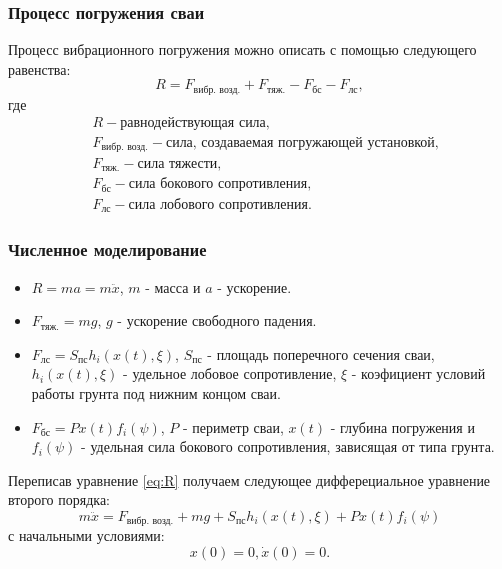 \documentclass{beamer}
\begin{document}
    \begin{frame}
        \frametitle{Процесс погружения сваи}
        Процесс вибрационного погружения можно описать с помощью следующего равенства:
        \begin{equation}
            \label{eq:R}
            R = F_\text{вибр. возд.} + F_\text{тяж.} - F_\text{бс} - F_\text{лс},
        \end{equation}
        где
        \begin{equation*}
            \begin{aligned}
                &R - \text{равнодействующая сила,}\\
                &F_\text{вибр. возд.} - \text{сила, создаваемая погружающей установкой,}\\
                &F_\text{тяж.} - \text{сила тяжести,}\\
                &F_\text{бс} - \text{сила бокового сопротивления,}\\
                &F_\text{лс} - \text{сила лобового сопротивления.}
            \end{aligned}
        \end{equation*}
    \end{frame}

    \begin{frame}
        \frametitle{Численное моделирование}
        \begin{itemize}
            \item $R = ma = m\ddot{x}$, { $m$ - масса и $a$ - ускорение.}
            \item $F_\text{тяж.} = mg$, { $g$ - ускорение свободного падения.}
            \item $F_\text{лс} = S_\text{пс} h_i(x(t), \xi)$, { $S_\text{пс}$ - площадь поперечного сечения
            сваи, $h_i(x(t), \xi)$ - удельное лобовое сопротивление, $\xi$ - коэфициент условий работы грунта под нижним
            концом сваи.}
            \item $F_\text{бс} = P x(t) f_i(\psi)$, { $P$ - периметр сваи, $x(t)$ - глубина погружения и $f_i(\psi)$ - удельная
            сила бокового сопротивления, зависящая от типа грунта.}
            \end{itemize}
        Переписав уравнение \ref{eq:R} получаем следующее дифферециальное уравнение второго порядка:
        \begin{equation}
            \label{eq:main}
            m\ddot{x} = F_\text{вибр. возд.} + mg + S_\text{пс} h_i(x(t), \xi) + P x(t) f_i(\psi)
        \end{equation}
        с начальными условиями:
        \begin{equation*}
            x(0) = 0, \dot{x}(0) = 0.
        \end{equation*}
    \end{frame}
\end{document}
